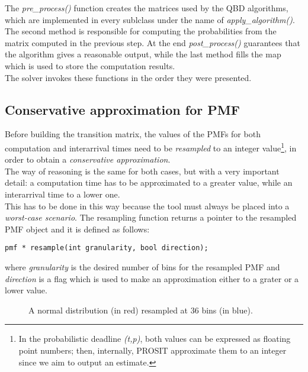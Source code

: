 The \emph{pre\_process()} function creates the matrices used by the QBD algorithms, which are implemented in every sublclass under the name of \emph{apply\_algorithm()}. The second method is responsible for computing the probabilities from the matrix computed in the previous step. At the end \emph{post\_process()} guarantees that the algorithm gives a reasonable output, while the last method fills the map which is used to store the computation results.\\
The solver invokes these functions in the order they were presented.

\subsection{Conservative approximation for PMF}
Before building the transition matrix, the values of the PMFs for both computation and interarrival times need to be \emph{resampled} to an integer value\footnote{In the probabilistic deadline \emph{(t,p)}, both values can be expressed as floating point numbers; then, internally, PROSIT approximate them to an integer since we aim to output an estimate.}, in order to obtain a \emph{conservative approximation}.\\
The way of reasoning is the same for both cases, but with a very important detail: a computation time has to be approximated to a greater value, while an interarrival time to a lower one.\\ 
This has to be done in this way because the tool must always be placed into a \emph{worst-case scenario}. The resampling function returns a pointer to the resampled PMF object and it is defined as follows:
\begin{lstlisting}[frame=bt]
  pmf * resample(int granularity, bool direction);
\end{lstlisting}

where \emph{granularity} is the desired number of bins for the resampled PMF and \emph{direction} is a flag which is used to make an approximation either to a grater or a lower value.\\
\begin{figure}[H]
  \caption{A normal distribution (in red) resampled at 36 bins (in blue).}
  \label{resample}
\end{figure}

